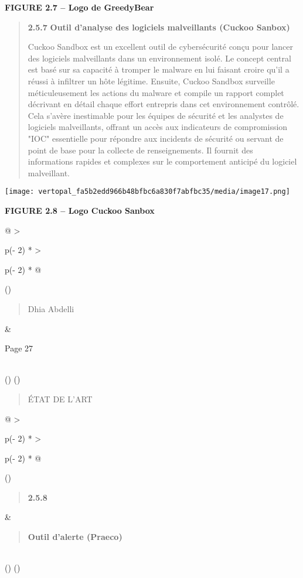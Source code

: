 \documentclass[
]{article}
\begin{document}
\textbf{FIGURE 2.7 -- Logo de GreedyBear}

\begin{quote}
\textbf{2.5.7} \textbf{Outil d'analyse des logiciels malveillants
(Cuckoo Sanbox)}

Cuckoo Sandbox est un excellent outil de cybersécurité conçu pour lancer
des logiciels malveillants dans un environnement isolé. Le concept
central est basé sur sa capacité à tromper le malware en lui faisant
croire qu'il a réussi à infiltrer un hôte légitime. Ensuite, Cuckoo
Sandbox surveille méticuleusement les actions du malware et compile un
rapport complet décrivant en détail chaque effort entrepris dans cet
environnement contrôlé. Cela s'avère inestimable pour les équipes de
sécurité et les analystes de logiciels malveillants, offrant un accès
aux indicateurs de compromission "IOC" essentielle pour répondre aux
incidents de sécurité ou servant de point de base pour la collecte de
renseignements. Il fournit des informations rapides et complexes sur le
comportement anticipé du logiciel malveillant.
\end{quote}

\texttt{[image: vertopal\_fa5b2edd966b48bfbc6a830f7abfbc35/media/image17.png]}

\textbf{FIGURE 2.8 -- Logo Cuckoo Sanbox}

\begin{longtable}[]{@{}
  >{\raggedright\arraybackslash}p{(\columnwidth - 2\tabcolsep) * }
  >{\raggedright\arraybackslash}p{(\columnwidth - 2\tabcolsep) * }@{}}
\toprule()
\begin{minipage}[b]{\linewidth}\raggedright
\begin{quote}
Dhia Abdelli
\end{quote}
\end{minipage} & \begin{minipage}[b]{\linewidth}\raggedright
Page 27
\end{minipage} \\
\midrule()
\endhead
\bottomrule()
\end{longtable}

\begin{quote}
ÉTAT DE L'ART
\end{quote}

\begin{longtable}[]{@{}
  >{\raggedright\arraybackslash}p{(\columnwidth - 2\tabcolsep) * }
  >{\raggedright\arraybackslash}p{(\columnwidth - 2\tabcolsep) * }@{}}
\toprule()
\begin{minipage}[b]{\linewidth}\raggedright
\begin{quote}
\textbf{2.5.8}
\end{quote}
\end{minipage} & \begin{minipage}[b]{\linewidth}\raggedright
\begin{quote}
\textbf{Outil d'alerte (Praeco)}
\end{quote}
\end{minipage} \\
\midrule()
\endhead
\bottomrule()
\end{longtable}
\end{document}
